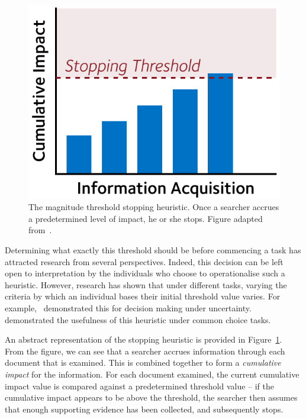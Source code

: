 \begin{figure}
    \begin{center}
    \vspace*{-10mm}
    \includegraphics[width=1\textwidth]{figures/ch3-threshold.pdf}
    \end{center}
    \vspace*{-4mm}
    \caption[The magnitude threshold stopping heuristic]{The magnitude threshold stopping heuristic. Once a searcher accrues a predetermined level of impact, he or she stops. Figure adapted from~\cite{browne2004stopping_rules}.}
    \label{fig:threshold}
\end{figure}

Determining what exactly this threshold should be before commencing a task has attracted research from several perspectives. Indeed, this decision can be left open to interpretation by the individuals who choose to operationalise such a heuristic. However, research has shown that under different tasks, varying the criteria by which an individual bases their initial threshold value varies. For example,~\cite{busemeyer1982choice_behaviour} demonstrated this for decision making under uncertainty.~\cite{saad1996stopping} demonstrated the usefulness of this heuristic under common choice tasks.

An abstract representation of the stopping heuristic is provided in Figure~\ref{fig:threshold}. From the figure, we can see that a searcher accrues information through each document that is examined. This is combined together to form a \emph{cumulative impact} for the information. For each document examined, the current cumulative impact value is compared against a predetermined threshold value -- if the cumulative impact appears to be above the threshold, the searcher then assumes that enough supporting evidence has been collected, and subsequently stops.

